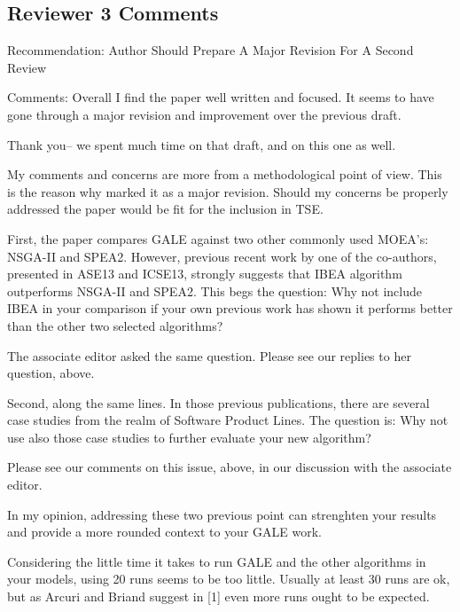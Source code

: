 \documentclass[10pt,journal,compsoc]{IEEEtran}
\newenvironment{changed}{\par\color{MyDarkBlue}}{\par}
\begin{document}
\subsection{Reviewer 3 Comments}

Recommendation: Author Should Prepare A Major Revision For A Second Review

Comments:
Overall I find the paper well written and focused. It seems to have gone through a major revision and improvement over the previous draft.
\begin{changed}
Thank you-- we spent much time on that draft, and on this one as well.
\end{changed}

My comments and concerns are more from a methodological point of view. This is the reason why marked it as a major revision. Should my concerns be properly addressed the paper would be fit for the inclusion in TSE.

First, the paper compares GALE against two other commonly used MOEA's: NSGA-II and SPEA2. However, previous recent work by one of the co-authors, presented in ASE13 and ICSE13, strongly suggests that IBEA algorithm outperforms NSGA-II and SPEA2. This begs the question: Why not include IBEA in your comparison if your own previous work has shown it performs better than the other two selected algorithms?

\begin{changed}
The associate editor asked the same question. Please see our replies
to her question, above.
\end{changed}

Second, along the same lines. In those previous
publications, there are several case studies from
the realm of Software Product Lines. The question
is: Why not use also those case studies to further
evaluate your new algorithm?


\begin{changed}
Please see our comments on this issue, above, in our discussion with the
associate editor.
\end{changed}
In my opinion, addressing these two previous point can strenghten your results and provide a more rounded context to your GALE work.

Considering the little time it takes to run GALE and the other algorithms in your models, using 20 runs seems to be too little. Usually at least 30 runs are ok, but as Arcuri and Briand suggest in [1] even more runs ought to be expected.
\end{document}

